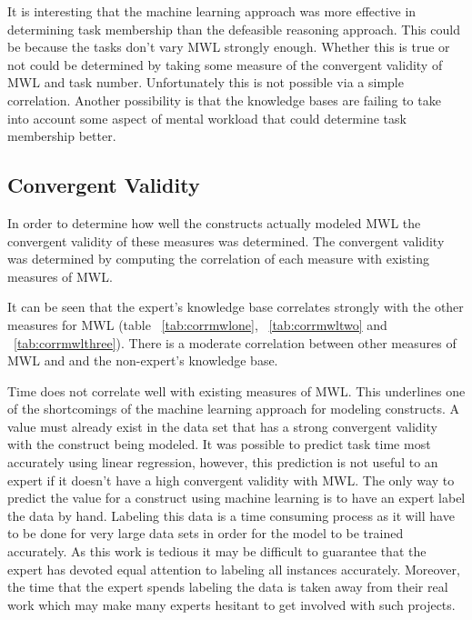 It is interesting that the machine learning approach was more effective in determining task membership than the defeasible reasoning approach. This could be because the tasks don't vary MWL strongly enough. Whether this is true or not could be determined by taking some measure of the convergent validity of MWL and task number. Unfortunately this is not possible via a simple correlation. Another possibility is that the knowledge bases are failing to take into account some aspect of mental workload that could determine task membership better.

\subsection{Convergent Validity}

In order to determine how well the constructs actually modeled MWL the convergent validity of these measures was determined. The convergent validity was determined by computing the correlation of each measure with existing measures of MWL. 

It can be seen that the expert's knowledge base correlates strongly with the other measures for MWL (table ~\ref{tab:corrmwlone}, ~\ref{tab:corrmwltwo} and ~\ref{tab:corrmwlthree}). There is a moderate correlation between other measures of MWL and and the non-expert's knowledge base. 

Time does not correlate well with existing measures of MWL. This underlines one of the shortcomings of the machine learning approach for modeling constructs. A value must already exist in the data set that has a strong convergent validity with the construct being modeled. It was possible to predict task time most accurately using linear regression, however, this prediction is not useful to an expert if it doesn't have a high convergent validity with MWL. The only way to predict the value for a construct using machine learning is to have an expert label the data by hand. Labeling this data is a time consuming process as it will have to be done for very large data sets in order for the model to be trained accurately. As this work is tedious it may be difficult to guarantee that the expert has devoted equal attention to labeling all instances accurately. Moreover, the time that the expert spends labeling the data is taken away from their real work which may make many experts hesitant to get involved with such projects.

